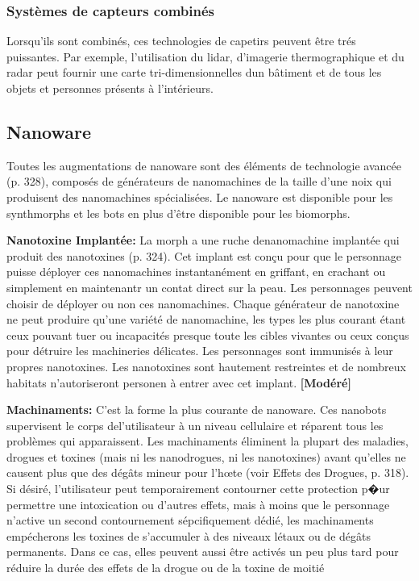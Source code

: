{{\subsubsection{Systèmes de capteurs combinés} 

Lorsqu'ils sont combinés, ces technologies de capetirs peuvent être trés puissantes. Par exemple, l'utilisation du lidar, d'imagerie thermographique et du radar peut fournir une carte tri-dimensionnelles dun bâtiment et de tous les objets et personnes présents à l'intérieurs. 



\subsection{Nanoware} \label{sec:nanoware} 

Toutes les augmentations de nanoware sont des éléments de technologie avancée (p. 328), composés de générateurs de nanomachines de la taille d'une noix qui produisent des nanomachines spécialisées. Le nanoware est disponible pour les synthmorphs et les bots en plus d'être disponible pour les biomorphs. 

\textbf{Nanotoxine Implantée:} La morph a une ruche denanomachine implantée qui produit des nanotoxines (p. 324). Cet implant est conçu pour que le personnage puisse déployer ces nanomachines instantanément en griffant, en crachant ou simplement en maintenantr un contat direct sur la peau. Les personnages peuvent choisir de déployer ou non ces nanomachines. Chaque générateur de nanotoxine ne peut produire qu'une variété de nanomachine, les types les plus courant étant ceux pouvant tuer ou incapacités presque toute les cibles vivantes ou ceux conçus pour détruire les machineries délicates. Les personnages sont immunisés à leur propres nanotoxines. Les nanotoxines sont hautement restreintes et de nombreux habitats n'autoriseront personen à entrer avec cet implant. \textbf{[Modéré]} 

\textbf{Machinaments:} C'est la forme la plus courante de nanoware. Ces nanobots supervisent le corps del'utilisateur à un niveau cellulaire et réparent tous les problèmes qui apparaissent. Les machinaments éliminent la plupart des maladies, drogues et toxines (mais ni les nanodrogues, ni les nanotoxines) avant qu'elles ne causent plus que des dégâts mineur pour l'hœte (voir Effets des Drogues, p. 318). Si désiré, l'utilisateur peut temporairement contourner cette protection p�ur permettre une intoxication ou d'autres effets, mais à moins que le personnage n'active un second contournement sépcifiquement dédié, les machinaments empécherons les toxines de s'accumuler à des niveaux létaux ou de dégâts permanents. Dans ce cas, elles peuvent aussi être activés un peu plus tard pour réduire la durée des effets de la drogue ou de la toxine de moitié 

}}
